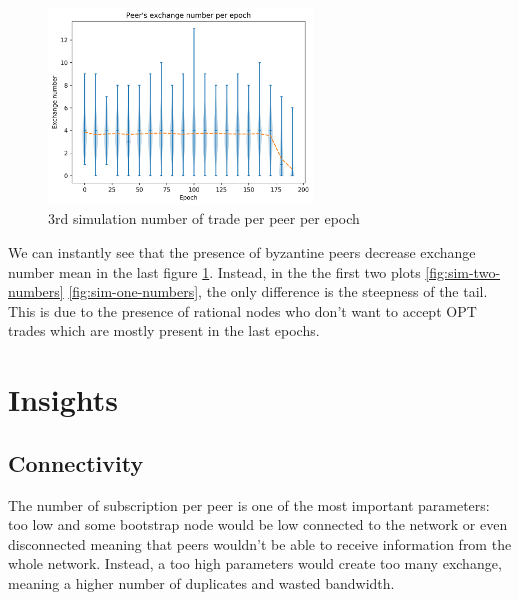 \documentclass[mscthesis]{usiinfthesis}
\begin{document}
\begin{figure}[H]
  \centering
  \includegraphics[width=7cm]{images/3/3-exchane-n.png}
  \caption{3rd simulation number of trade per peer per epoch}
  \label{fig:sim-three-numbers}
\end{figure}

We can instantly see that the presence of byzantine peers decrease exchange number mean in the last figure \ref{fig:sim-three-numbers}. Instead, in the the first two plots \ref{fig:sim-two-numbers} \ref{fig:sim-one-numbers}, the only difference is the steepness of the tail. This is due to the presence of rational nodes who don't want to accept OPT trades which are mostly present in the last epochs. 

\section{Insights}
\subsection{Connectivity}
The number of subscription per peer is one of the most important parameters: too low and some bootstrap node would be low connected to the network or even disconnected meaning that peers wouldn't be able to receive information from the whole network.
Instead, a too high parameters would create too many exchange, meaning a higher number of duplicates and wasted bandwidth. 
\end{document}
